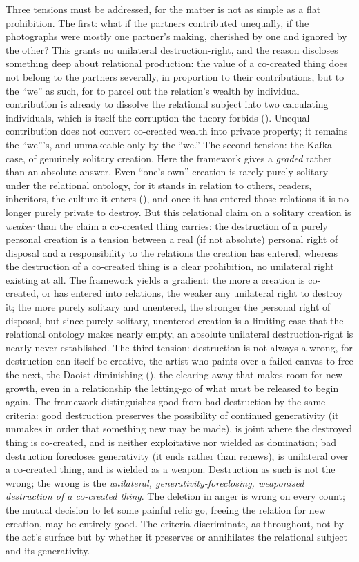 Three tensions must be addressed, for the matter is not as simple as a flat prohibition. The first: what if the partners contributed unequally, if the photographs were mostly one partner's making, cherished by one and ignored by the other? This grants no unilateral destruction-right, and the reason discloses something deep about relational production: the value of a co-created thing does not belong to the partners severally, in proportion to their contributions, but to the ``we'' as such, for to parcel out the relation's wealth by individual contribution is already to dissolve the relational subject into two calculating individuals, which is itself the corruption the theory forbids (). Unequal contribution does not convert co-created wealth into private property; it remains the ``we'''s, and unmakeable only by the ``we.'' The second tension: the Kafka case, of genuinely solitary creation. Here the framework gives a \emph{graded} rather than an absolute answer. Even ``one's own'' creation is rarely purely solitary under the relational ontology, for it stands in relation to others, readers, inheritors, the culture it enters (), and once it has entered those relations it is no longer purely private to destroy. But this relational claim on a solitary creation is \emph{weaker} than the claim a co-created thing carries: the destruction of a purely personal creation is a tension between a real (if not absolute) personal right of disposal and a responsibility to the relations the creation has entered, whereas the destruction of a co-created thing is a clear prohibition, no unilateral right existing at all. The framework yields a gradient: the more a creation is co-created, or has entered into relations, the weaker any unilateral right to destroy it; the more purely solitary and unentered, the stronger the personal right of disposal, but since purely solitary, unentered creation is a limiting case that the relational ontology makes nearly empty, an absolute unilateral destruction-right is nearly never established. The third tension: destruction is not always a wrong, for destruction can itself be creative, the artist who paints over a failed canvas to free the next, the Daoist diminishing (), the clearing-away that makes room for new growth, even in a relationship the letting-go of what must be released to begin again. The framework distinguishes good from bad destruction by the same criteria: good destruction preserves the possibility of continued generativity (it unmakes in order that something new may be made), is joint where the destroyed thing is co-created, and is neither exploitative nor wielded as domination; bad destruction forecloses generativity (it ends rather than renews), is unilateral over a co-created thing, and is wielded as a weapon. Destruction as such is not the wrong; the wrong is the \emph{unilateral, generativity-foreclosing, weaponised destruction of a co-created thing}. The deletion in anger is wrong on every count; the mutual decision to let some painful relic go, freeing the relation for new creation, may be entirely good. The criteria discriminate, as throughout, not by the act's surface but by whether it preserves or annihilates the relational subject and its generativity.

